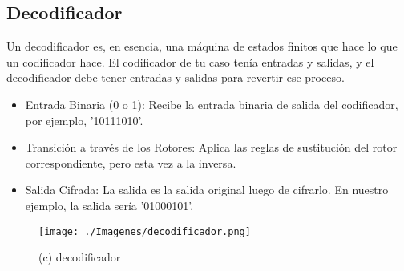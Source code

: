 \documentclass{article}
\begin{document}
    
    \newpage



    \subsection{Decodificador}
    Un decodificador es, en esencia, una máquina de estados finitos que hace lo que un codificador hace. El codificador de tu caso tenía entradas y salidas, y el decodificador debe tener entradas y salidas para revertir ese proceso.    

    \begin{itemize}
        \item Entrada Binaria (0 o 1): Recibe la entrada binaria de salida del codificador, por ejemplo, '10111010'.
        \item Transición a través de los Rotores: Aplica las reglas de sustitución del rotor correspondiente, pero esta vez a la inversa.
        \item Salida Cifrada: La salida es la salida original luego de cifrarlo. En nuestro ejemplo, la salida sería '01000101'.
    \end{itemize}

    \vspace{\baselineskip} %
    
    \vspace{\baselineskip} %
    \vspace{\baselineskip} %

    \begin{figure}[!h]
        \centering
        \texttt{[image: ./Imagenes/decodificador.png]}
        \caption*{(c) decodificador}
    \end{figure}

    
\end{document}
